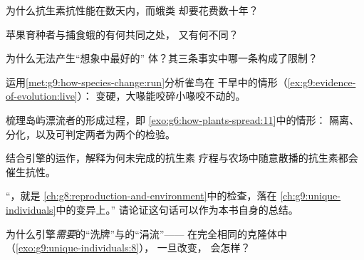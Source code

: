 \begin{exercise}[$\star$]\label{exo:g9:how-species-change:5}
为什么抗生素抗性能在数天内，而蛾类
却要花费数十年？
\end{exercise}

\begin{exercise}[$\star$]\label{exo:g9:how-species-change:6}
苹果育种者与捕食蛾的有何共同之处，
又有何不同？
\end{exercise}

\begin{exercise}[$\star\star$]\label{exo:g9:how-species-change:7}
为什么无法产生“想象中最好的”
体？其三条事实中哪一条构成了限制？
\end{exercise}

\begin{exercise}[$\star\star$]\label{exo:g9:how-species-change:8}
运用\cref{met:g9:how-species-change:run}分析雀鸟在
干旱中的情形（\cref{ex:g9:evidence-of-evolution:live}）：
变硬，大喙能咬碎小喙咬不动的。
\end{exercise}

\begin{exercise}[$\star\star$]\label{exo:g9:how-species-change:9}
梳理岛屿漂流者的形成过程，即
\cref{exo:g6:how-plants-spread:11}中的情形：
隔离、分化，以及可判定两者为两个的检验。
\end{exercise}

\begin{exercise}[$\star\star$]\label{exo:g9:how-species-change:10}
结合引擎的运作，解释为何未完成的抗生素
疗程与农场中随意散播的抗生素都会
催生抗性。
\end{exercise}

\begin{exercise}[$\star\star$]\label{exo:g9:how-species-change:11}
“，就是
\cref{ch:g8:reproduction-and-environment}中的检查，落在
\cref{ch:g9:unique-individuals}中的变异上。”
请论证这句话可以作为本书自身的总结。
\end{exercise}

\begin{exercise}[$\star\star\star$]\label{exo:g9:how-species-change:12}
为什么引擎\emph{需要}的“洗牌”与的“涓流”——
在完全相同的克隆体中
（\cref{exo:g9:unique-individuals:8}），
一旦改变，
会怎样？
\end{exercise}


